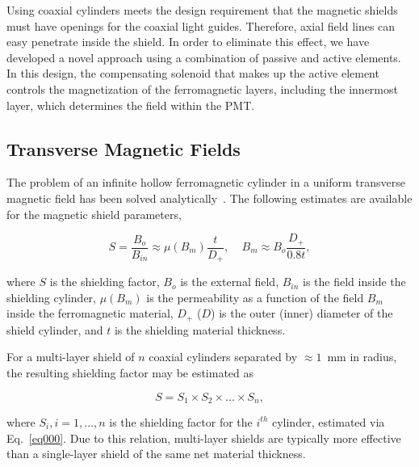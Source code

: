 \documentclass[12pt]{article}
\begin{document}
Using coaxial cylinders meets the design  requirement that the magnetic shields must 
have openings for the coaxial light guides. Therefore, axial field lines can easy 
penetrate inside the shield. In order to eliminate this effect, we have developed a 
novel approach using a combination of passive and active elements. In this design, the 
compensating solenoid that makes up the active element controls the magnetization of 
the ferromagnetic layers, including the innermost layer, which determines the field 
within the PMT.

\subsection{Transverse Magnetic Fields}

The problem of an infinite hollow ferromagnetic cylinder in a uniform transverse 
magnetic field has been solved analytically~\cite{eltongluex}. The following
estimates are available for the magnetic shield parameters,

\begin{equation}
S=\frac{B_o}{B_{in}}\approx \mu({B_m})\frac{t}{D_+},~~~~~
B_m\approx B_o\frac{D_+}{0.8t},
\label{eq000}
\end{equation}

\noindent
where $S$ is the shielding factor, $B_o$ is the external field, $B_{in}$ is 
the field inside the shielding cylinder, $\mu(B_m)$ is the permeability as a 
function of the field $B_m$ inside the ferromagnetic material, $D_+$ ($D$) is 
the outer (inner) diameter of the shield cylinder, and $t$ is the shielding 
material thickness. 

For a multi-layer shield of $n$ coaxial cylinders separated by $\approx 1$~mm in 
radius, the resulting shielding factor may be estimated as

\begin{equation}
S=S_1 \times S_2 \times...\times S_n,
\label{eq777}
\end{equation}

\noindent
where $S_i,i=1,...,n$ is the shielding factor for the $i^{th}$ cylinder, estimated 
via Eq.~\ref{eq000}. Due to this relation, multi-layer shields are typically more 
effective than a single-layer shield of the same net material thickness.
\end{document}
